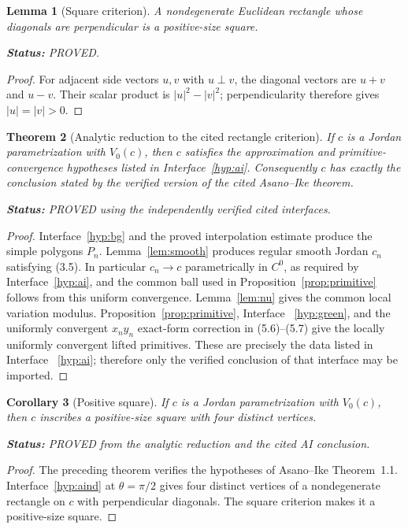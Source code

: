 \documentclass[11pt]{article}
\newtheorem{theorem}{Theorem}
\newtheorem{lemma}[theorem]{Lemma}
\newtheorem{corollary}[theorem]{Corollary}
\theoremstyle{definition}
\theoremstyle{remark}
\newcommand{\status}[1]{\par\smallskip\noindent\textbf{Status:}
  \begingroup\small\sffamily #1.\endgroup\par\smallskip}
\begin{document}
\begin{lemma}[Square criterion]
A nondegenerate Euclidean rectangle whose diagonals are perpendicular is a
positive-size square.
\status{PROVED}
\end{lemma}
\begin{proof}
For adjacent side vectors $u,v$ with $u\perp v$, the diagonal vectors are
$u+v$ and $u-v$.  Their scalar product is $|u|^2-|v|^2$; perpendicularity
therefore gives $|u|=|v|>0$.
\end{proof}

\begin{theorem}[Analytic reduction to the cited rectangle criterion]
If $c$ is a Jordan parametrization with
$V_0(c)$, then $c$ satisfies the approximation and primitive-convergence
hypotheses listed in Interface~\ref{hyp:ai}.  Consequently $c$ has
\emph{exactly the conclusion stated by the verified version} of the cited
Asano--Ike theorem.
\status{PROVED using the independently verified cited interfaces}
\end{theorem}

\begin{proof}
Interface~\ref{hyp:bg} and the proved interpolation estimate produce the
simple polygons $P_n$.  Lemma~\ref{lem:smooth} produces regular smooth
Jordan $c_n$ satisfying (3.5).  In particular $c_n\to c$ parametrically in
$C^0$, as required by Interface~\ref{hyp:ai}, and the common ball used in
Proposition~\ref{prop:primitive} follows from this uniform convergence.
Lemma~\ref{lem:nu} gives the common local
variation modulus.  Proposition~\ref{prop:primitive}, Interface
~\ref{hyp:green}, and the uniformly convergent $x_ny_n$ exact-form correction
in (5.6)--(5.7) give the locally uniformly convergent lifted primitives.
These are precisely the data listed in Interface
~\ref{hyp:ai}; therefore only the verified conclusion of that interface may
be imported.
\end{proof}

\begin{corollary}[Positive square]\label{cor:positive-square}
If $c$ is a Jordan parametrization with $V_0(c)$, then $c$ inscribes a
positive-size square with four distinct vertices.
\status{PROVED from the analytic reduction and the cited AI conclusion}
\end{corollary}
\begin{proof}
The preceding theorem verifies the hypotheses of Asano--Ike Theorem~1.1.
Interface~\ref{hyp:aind} at $\theta=\pi/2$ gives four distinct vertices of a
nondegenerate rectangle on $c$ with perpendicular diagonals.  The square
criterion makes it a positive-size square.
\end{proof}
\end{document}
